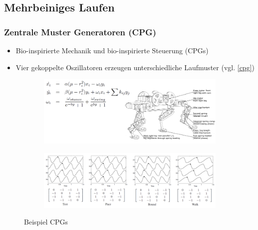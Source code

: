 \subsection{Mehrbeiniges Laufen}
\subsubsection{Zentrale Muster Generatoren (CPG)}
\begin{itemize}
\item Bio-inspirierte Mechanik und bio-inspirierte Steuerung (CPGs)
\item Vier gekoppelte Oszillatoren erzeugen unterschiedliche Laufmuster (vgl. \autoref{cpg})
\end{itemize}
\begin{figure}[h!]
	\centering
	\begin{subfigure}{.6\textwidth}
		\includegraphics[width=\textwidth]{figures/ch06_cpg1.png}
		\caption{}
		\label{cpg1}
	\end{subfigure}
	\begin{subfigure}{.6\textwidth}
		\includegraphics[width=\textwidth]{figures/ch06_cpg2.png}
		\caption{}
		\label{cpg2}
	\end{subfigure}
	\caption{Beispiel CPGs}
	\label{cpg}
\end{figure}
